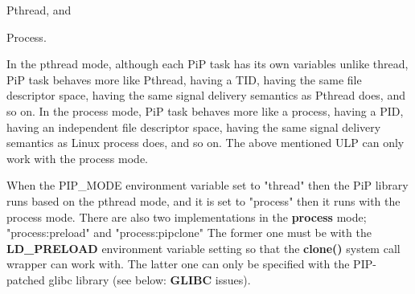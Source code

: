 \begin{DoxyItemize}
\item {\ttfamily Pthread}, and
\item {\ttfamily Process}.
\end{DoxyItemize}

In the pthread mode, although each Pi\-P task has its own variables unlike thread, Pi\-P task behaves more like Pthread, having a T\-I\-D, having the same file descriptor space, having the same signal delivery semantics as Pthread does, and so on. In the process mode, Pi\-P task behaves more like a process, having a P\-I\-D, having an independent file descriptor space, having the same signal delivery semantics as Linux process does, and so on. The above mentioned U\-L\-P can only work with the process mode.

When the {\ttfamily P\-I\-P\-\_\-\-M\-O\-D\-E} environment variable set to "thread" then the Pi\-P library runs based on the pthread mode, and it is set to "process" then it runs with the process mode. There are also two implementations in the {\bfseries process} mode; "process\-:preload" and "process\-:pipclone" The former one must be with the {\bfseries L\-D\-\_\-\-P\-R\-E\-L\-O\-A\-D} environment variable setting so that the {\bfseries clone()} system call wrapper can work with. The latter one can only be specified with the P\-I\-P-\/patched glibc library (see below\-: {\bfseries G\-L\-I\-B\-C} issues).

